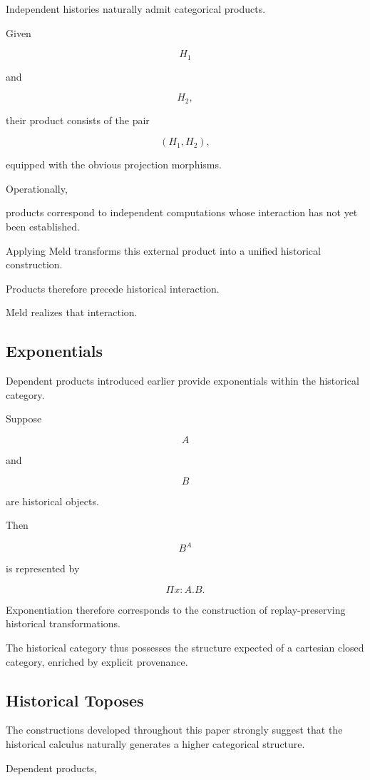 \documentclass[12pt,oneside]{article}
\theoremstyle{definition}
\theoremstyle{remark}
\begin{document}
Independent histories naturally admit categorical products.

Given

\[
H_1
\]

and

\[
H_2,
\]

their product consists of the pair

\[
(H_1,H_2),
\]

equipped with the obvious projection morphisms.

Operationally,

products correspond to independent computations whose interaction has not yet
been established.

Applying Meld transforms this external product into a unified historical
construction.

Products therefore precede historical interaction.

Meld realizes that interaction.

\subsection{Exponentials}

Dependent products introduced earlier provide exponentials within the historical
category.

Suppose

\[
A
\]

and

\[
B
\]

are historical objects.

Then

\[
B^A
\]

is represented by

\[
\Pi x:A.B.
\]

Exponentiation therefore corresponds to the construction of replay-preserving
historical transformations.

The historical category thus possesses the structure expected of a cartesian
closed category, enriched by explicit provenance.

\subsection{Historical Toposes}

The constructions developed throughout this paper strongly suggest that the
historical calculus naturally generates a higher categorical structure.

Dependent products,
\end{document}
